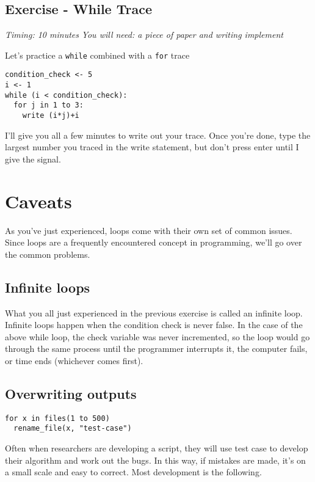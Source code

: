 \documentclass[
]{book}
\begin{document}
\subsection{Exercise - While Trace}\label{exercise---while-trace}

\emph{Timing: 10 minutes}
\emph{You will need: a piece of paper and writing implement}

Let's practice a \texttt{while} combined with a \texttt{for} trace

\begin{verbatim}
condition_check <- 5
i <- 1
while (i < condition_check):
  for j in 1 to 3:
    write (i*j)+i
\end{verbatim}

I'll give you all a few minutes to write out your trace. Once you're done,
type the largest number you traced in the write statement, but don't press enter until I give the signal.

\section{Caveats}\label{caveats}

As you've just experienced, loops come with their own set of common issues.\\
Since loops are a frequently encountered concept in programming, we'll go over the common problems.

\subsection{Infinite loops}\label{infinite-loops}

What you all just experienced in the previous exercise is called an infinite loop. Infinite loops happen when the condition check is never false. In the case
of the above while loop, the check variable was never incremented, so the loop would go through the same process until the programmer interrupts it, the computer fails, or time ends (whichever comes first).

\subsection{Overwriting outputs}\label{overwriting-outputs}

\begin{verbatim}
for x in files(1 to 500) 
  rename_file(x, "test-case")
\end{verbatim}

Often when researchers are developing a script, they will use test case to develop their algorithm and work out the bugs. In this way, if mistakes are made, it's on a small scale and easy to correct. Most development is the following.
\end{document}
